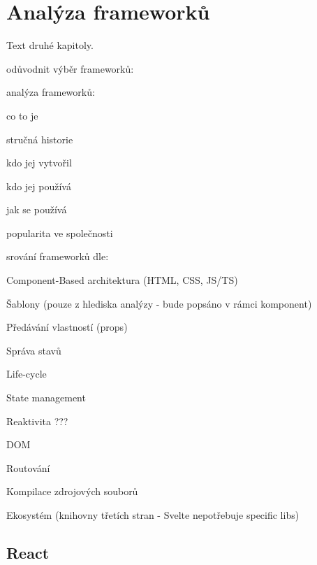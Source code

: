 \section{Analýza frameworků}

Text druhé kapitoly.

\begin{citemize}
	\item odůvodnit výběr frameworků:
	\begin{citemize}
		\item {}
	\end{citemize}

	\item analýza frameworků:
	\begin{citemize}
		\item co to je
		\item stručná historie
		\item kdo jej vytvořil
		\item kdo jej používá
		\item jak se používá
		\item popularita ve společnosti
	\end{citemize}

	\item srování frameworků dle:
	\begin{cenumerate}
		\item Component-Based architektura (HTML, CSS, JS/TS)
		\item Šablony (pouze z hlediska analýzy - bude popsáno v rámci komponent)
		\item Předávání vlastností (props)
		\item Správa stavů
		\item Life-cycle
		\item State management
		\item Reaktivita ???
		\item DOM
		\item Routování
		\item Kompilace zdrojových souborů
		\item Ekosystém (knihovny třetích stran - Svelte nepotřebuje specific libs)
	\end{cenumerate}
\end{citemize}


\subsection{React}

